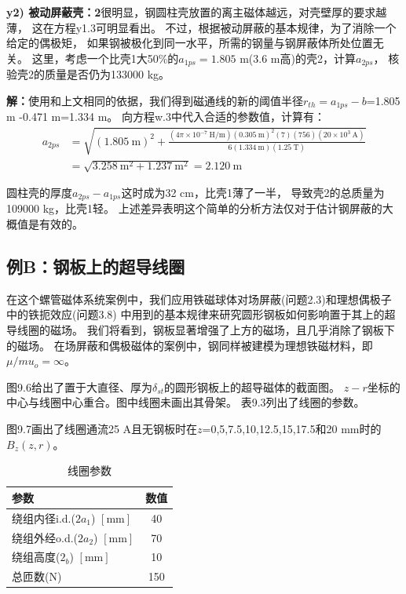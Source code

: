 \textbf{y2) 被动屏蔽壳：2}\qquad 很明显，钢圆柱壳放置的离主磁体越远，对壳壁厚的要求越薄，
这在方程y1.3可明显看出。
不过，根据被动屏蔽的基本规律，为了消除一个给定的偶极矩，
如果钢被极化到同一水平，所需的钢量与钢屏蔽体所处位置无关。
这里，考虑一个比壳1大50\%的$a_{1ps}=1.805$ m(3.6 m高)的壳2，计算$a_{2ps}$，
核验壳2的质量是否仍为133000 kg。

\textbf{解：}使用和上文相同的依据，我们得到磁通线的新的阈值半径$r_{th}=a_{1ps}-b$=1.805 m
-0.471 m=1.334 m。
向方程w.3中代入合适的参数值，计算有：
\begin{align*}%
a_{2ps}&=\sqrt{(1.805\ \mathrm{m})^2+\frac{(4\pi\times 10^{-7}\ \mathrm{H/m})(0.305\ \mathrm{m})^2(7)(756)(20\times 10^3\ \mathrm{A})}{6(1.334\ \mathrm{m})(1.25\ \mathrm{T})}}\\
&=\sqrt{3.258\ \mathrm{m^2}+1.237\ \mathrm{m^2}}=2.120\ \mathrm{m}
\end{align*}

圆柱壳的厚度$a_{2ps}-a_{1ps}$这时成为32 cm，比壳1薄了一半，
导致壳2的总质量为109000 kg，比壳1轻。
上述差异表明这个简单的分析方法仅对于估计钢屏蔽的大概值是有效的。


\subsection{例B：钢板上的超导线圈}
在这个螺管磁体系统案例中，我们应用铁磁球体对场屏蔽(问题2.3)和理想偶极子中的铁扼效应(问题3.8)
中用到的基本规律来研究圆形钢板如何影响置于其上的超导线圈的磁场。
我们将看到，钢板显著增强了上方的磁场，且几乎消除了钢板下的磁场。
在场屏蔽和偶极磁体的案例中，钢同样被建模为理想铁磁材料，即$\mu/mu_o=\infty$。

图9.6给出了置于大直径、厚为$\delta_{st}$的圆形钢板上的超导磁体的截面图。
$z-r$坐标的中心与线圈中心重合。图中线圈未画出其骨架。
表9.3列出了线圈的参数。

图9.7画出了线圈通流25 A且无钢板时在$z$=0,5,7.5,10,12.5,15,17.5和20 mm时的$B_z(z,r)$。

\begin{table}[htbp]\small
\centering
\caption{线圈参数}  
\begin{tabular}{|l|c|}
\hline
参数 & 数值 \\ \hline
绕组内径i.d.($2a_1$) $\left[\mathrm{mm}\right]$ & 40 \\ \hline
绕组外经o.d.($2a_2$) $\left[\mathrm{mm}\right]$ & 70 \\ \hline
绕组高度($2_b$) $\left[\mathrm{mm}\right]$ & 10 \\ \hline
总匝数(N) & 150 \\ \hline
\end{tabular}
\end{table}




